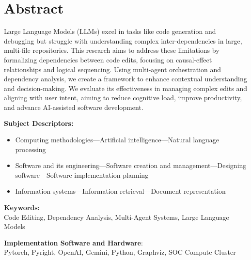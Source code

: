 \chapter*{Abstract}

Large Language Models (LLMs) excel in tasks like code generation and debugging but struggle with understanding complex inter-dependencies in large, multi-file repositories. This research aims to address these limitations by formalizing dependencies between code edits, focusing on causal-effect relationships and logical sequencing. Using multi-agent orchestration and dependency analysis, we create a framework to enhance contextual understanding and decision-making. We evaluate its effectiveness in managing complex edits and aligning with user intent, aiming to reduce cognitive load, improve productivity, and advance AI-assisted software development.


\noindent\textbf{Subject Descriptors:}
\begin{itemize}
    \item Computing methodologies---Artificial intelligence---Natural language processing
    \item Software and its engineering---Software creation and management---Designing software---Software implementation planning
    \item Information systems---Information retrieval---Document representation
\end{itemize}

\noindent\textbf{Keywords:}\\
\hspace*{.5cm} Code Editing, Dependency Analysis, Multi-Agent Systems, Large Language Models

\noindent\textbf{Implementation Software and Hardware}:\\
\hspace*{.5cm} Pytorch, Pyright, OpenAI, Gemini, Python, Graphviz, SOC Compute Cluster
